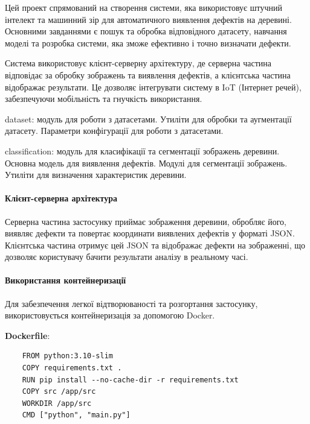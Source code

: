\documentclass[oneside,14pt]{extarticle}
\begin{document}
Цей проект спрямований на створення системи, яка використовує штучний інтелект та машинний зір для автоматичного виявлення дефектів на деревині. Основними завданнями є пошук та обробка відповідного датасету, навчання моделі та розробка системи, яка зможе ефективно і точно визначати дефекти.

Система використовує клієнт-серверну архітектуру, де серверна частина відповідає за обробку зображень та виявлення дефектів, а клієнтська частина відображає результати. Це дозволяє інтегрувати систему в IoT (Інтернет речей), забезпечуючи мобільність та гнучкість використання.

\begin{list}{-}{Основні компоненти проекту}
	\item dataset: модуль для роботи з датасетами. Утиліти для обробки та аугментації датасету. Параметри конфігурації для роботи з датасетами.
	\item classification: модуль для класифікації та сегментації зображень деревини. Основна модель для виявлення дефектів. Модулі для сегментації зображень. Утиліти для визначення характеристик деревини.
\end{list}

\paragraph{Клієнт-серверна архітектура}

Серверна частина застосунку приймає зображення деревини, обробляє його, виявляє дефекти та повертає координати виявлених дефектів у форматі JSON. Клієнтська частина отримує цей JSON та відображає дефекти на зображенні, що дозволяє користувачу бачити результати аналізу в реальному часі.

\paragraph{Використання контейнеризації}

Для забезпечення легкої відтворюваності та розгортання застосунку, використовується контейнеризація за допомогою Docker.

\textbf{Dockerfile}:

\begin{lstlisting}
	FROM python:3.10-slim
	COPY requirements.txt .
	RUN pip install --no-cache-dir -r requirements.txt
	COPY src /app/src
	WORKDIR /app/src
	CMD ["python", "main.py"]
\end{lstlisting}
\end{document}
